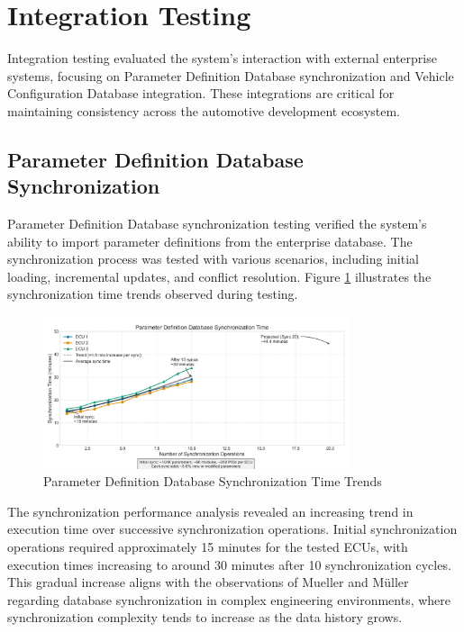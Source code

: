 \section{Integration Testing}
\label{sec:integration-testing}

Integration testing evaluated the system's interaction with external enterprise systems, focusing on Parameter Definition Database synchronization and Vehicle Configuration Database integration. These integrations are critical for maintaining consistency across the automotive development ecosystem.

\subsection{Parameter Definition Database Synchronization}
\label{subsec:pdd-synchronization-testing}

Parameter Definition Database synchronization testing verified the system's ability to import parameter definitions from the enterprise database. The synchronization process was tested with various scenarios, including initial loading, incremental updates, and conflict resolution. Figure \ref{fig:pdd-sync-time} illustrates the synchronization time trends observed during testing.

\begin{figure}[h]
    \centering
    \includegraphics[width=0.8\textwidth]{figures/pdd_sync_time_graph.png}
    \caption{Parameter Definition Database Synchronization Time Trends}
    \label{fig:pdd-sync-time}
\end{figure}

The synchronization performance analysis revealed an increasing trend in execution time over successive synchronization operations. Initial synchronization operations required approximately 15 minutes for the tested \acp{ECU}, with execution times increasing to around 30 minutes after 10 synchronization cycles. This gradual increase aligns with the observations of Mueller and Müller \cite{mueller2018conception} regarding database synchronization in complex engineering environments, where synchronization complexity tends to increase as the data history grows.

